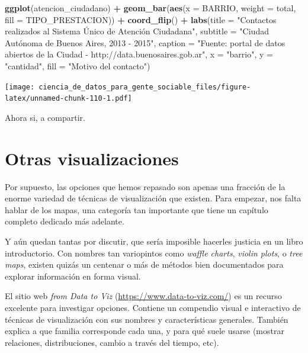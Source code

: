 \documentclass[]{book}
\newenvironment{Shaded}{\begin{snugshade}}{\end{snugshade}}
\newcommand{\KeywordTok}[1]{\textcolor[rgb]{0.13,0.29,0.53}{\textbf{#1}}}
\newcommand{\DataTypeTok}[1]{\textcolor[rgb]{0.13,0.29,0.53}{#1}}
\newcommand{\StringTok}[1]{\textcolor[rgb]{0.31,0.60,0.02}{#1}}
\newcommand{\OperatorTok}[1]{\textcolor[rgb]{0.81,0.36,0.00}{\textbf{#1}}}
\newcommand{\NormalTok}[1]{#1}
\begin{document}
\begin{Shaded}
\begin{Highlighting}[]
\KeywordTok{ggplot}\NormalTok{(atencion_ciudadano) }\OperatorTok{+}
\StringTok{    }\KeywordTok{geom_bar}\NormalTok{(}\KeywordTok{aes}\NormalTok{(}\DataTypeTok{x =}\NormalTok{ BARRIO, }\DataTypeTok{weight =}\NormalTok{ total, }\DataTypeTok{fill =}\NormalTok{ TIPO_PRESTACION)) }\OperatorTok{+}
\StringTok{    }\KeywordTok{coord_flip}\NormalTok{() }\OperatorTok{+}
\StringTok{    }\KeywordTok{labs}\NormalTok{(}\DataTypeTok{title =} \StringTok{"Contactos realizados al Sistema Único de Atención Ciudadana"}\NormalTok{,}
         \DataTypeTok{subtitle =} \StringTok{"Ciudad Autónoma de Buenos Aires, 2013 - 2015"}\NormalTok{,}
         \DataTypeTok{caption =} \StringTok{"Fuente: portal de datos abiertos de la Ciudad - http://data.buenosaires.gob.ar"}\NormalTok{,}
         \DataTypeTok{x =} \StringTok{"barrio"}\NormalTok{,}
         \DataTypeTok{y =} \StringTok{"cantidad"}\NormalTok{,}
         \DataTypeTok{fill =} \StringTok{"Motivo del contacto"}\NormalTok{)}
\end{Highlighting}
\end{Shaded}

\texttt{[image: ciencia\_de\_datos\_para\_gente\_sociable\_files/figure-latex/unnamed-chunk-110-1.pdf]}

Ahora si, a compartir.

\section{Otras visualizaciones}\label{otras-visualizaciones}

Por supuesto, las opciones que hemos repasado son apenas una fracción de
la enorme variedad de técnicas de visualización que existen. Para
empezar, nos falta hablar de los mapas, una categoría tan importante que
tiene un capítulo completo dedicado más adelante.

Y aún quedan tantas por discutir, que sería imposible hacerles justicia
en un libro introductorio. Con nombres tan variopintos como \emph{waffle
charts}, \emph{violin plots}, o \emph{tree maps}, existen quizás un
centenar o más de métodos bien documentados para explorar información en
forma visual.

El sitio web \emph{from Data to Viz}
(\url{https://www.data-to-viz.com/}) es un recurso excelente para
investigar opciones. Contiene un compendio visual e interactivo de
técnicas de visualización con sus nombres y características generales.
También explica a que familia corresponde cada una, y para qué suele
usarse (mostrar relaciones, distribuciones, cambio a través del tiempo,
etc).
\end{document}
